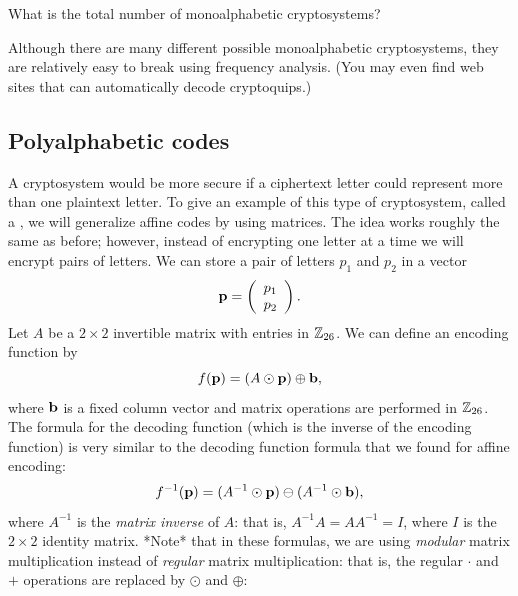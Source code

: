 \begin{exercise}{}
What is the total number of monoalphabetic cryptosystems?
\end{exercise}
Although there are many different possible monoalphabetic cryptosystems, they are relatively easy to break using frequency analysis. (You may even find web sites that can automatically decode cryptoquips.)


\subsection{Polyalphabetic codes}

A cryptosystem would be more secure if a ciphertext letter could
represent more than one plaintext letter.  To give an example of this
type of cryptosystem, called a , we will generalize
affine codes by using matrices. The idea works roughly the same as
before; however, instead of encrypting one letter at a time we will
encrypt pairs of letters.  We can store a pair of letters $p_1$ and
$p_2$ in a vector  
$$
{\bold p} = 
\left(
\begin{array}{c}
p_1 \\ p_2
\end{array}
\right).
$$
Let $A$ be a $2 \times 2$ invertible matrix
with entries in ${\Bbb Z}_{26}$. We can define an encoding function by
$$
f({\bold p}) = (A \odot {\bold p}) \oplus {\bold b} ,
$$
where ${\bold b}$ is a fixed column vector and matrix operations are
performed in ${\Bbb Z}_{26}$. The formula for  the decoding function (which is the inverse of the encoding function) is very similar to the decoding function formula that we found for affine encoding:
$$
f^{-1}({\bold p}) = (A^{-1} \odot {\bold p}) \ominus (A^{-1} \odot {\bold b}),
$$
where $A^{-1}$ is the \emph{matrix inverse} of $A$: that is, $A^{-1}A = A A^{-1} = I$, where $I$ is the $2 \times 2$ identity matrix.  *Note* that in these formulas, we are using \emph{modular} matrix multiplication instead of \emph{regular} matrix multiplication: that is, the  regular $\cdot$ and $+$ operations are replaced by  $\odot$ and $\oplus$:

